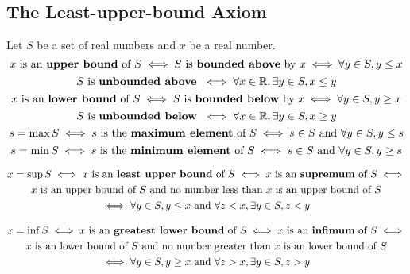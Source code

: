 \documentclass{report}
\begin{document}
\subsection{The Least-upper-bound Axiom}
\begin{definition}
Let $S$ be a set of real numbers and  $x$ be a real number.
\begin{equation}
 x\text{ is an \textbf{upper bound} of  }S\iff S\text{ is \textbf{bounded above} by }x\iff\forall y\in S, y\leq x  
\end{equation}
\begin{equation}
S\text{ is \textbf{unbounded above} }\iff \forall x\in\mathbb{R},\exists y\in S, x\leq y
\end{equation}
\begin{equation}
 x\text{ is an \textbf{lower bound} of  }S\iff S\text{ is \textbf{bounded below} by }x\iff\forall y\in S, y\geq  x  
\end{equation}
\begin{equation}
S\text{ is \textbf{unbounded below} }\iff \forall x\in\mathbb{R},\exists y\in S, x\geq  y
\end{equation}
\begin{equation}
s=\max S\iff s\text{ is the \textbf{maximum element} of }S\iff s\in S\text{ and }\forall y\in S,y\leq s
\end{equation}
\begin{equation}
s=\min S\iff s\text{ is the \textbf{minimum element} of }S\iff s\in S\text{ and }\forall y\in S,y\geq s
\end{equation}
\end{definition}
\begin{definition}
    \begin{multline}
     x=\sup S\iff x\text{ is an \textbf{least upper bound} of }S\iff x\text{ is an \textbf{supremum} of }S\iff \\
 x\text{ is an upper bound of }S\text{ and no number less than $x$ is an upper bound of $S$}\\
 \iff \forall y\in S, y\leq x\text{ and }\forall z<x,\exists y\in S, z<y
      \end{multline}
\end{definition}
\begin{definition}
    \begin{multline}
x=\inf S\iff  x\text{ is an \textbf{greatest lower bound} of }S\iff x\text{ is an \textbf{infimum} of }S\iff \\
 x\text{ is an lower bound of }S\text{ and no number greater than $x$ is an lower bound of $S$}\\
 \iff \forall y\in S, y\geq x\text{ and }\forall z>x,\exists y\in S, z> y
      \end{multline}
\end{definition}
\end{document}
